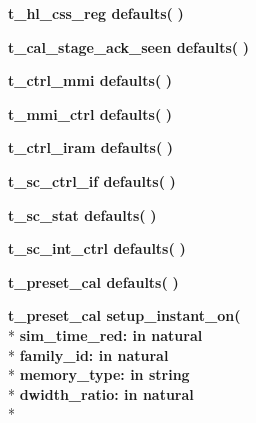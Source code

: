 \begin{DoxyCompactItemize}
\item 
{\bfseries {\bfseries {\bfseries {\bf t\+\_\+hl\+\_\+css\+\_\+reg}} \textcolor{vhdlchar}{ }}} {\bf defaults}{\bfseries  ( }{\bfseries  )} 
\item 
{\bfseries {\bfseries {\bfseries {\bf t\+\_\+cal\+\_\+stage\+\_\+ack\+\_\+seen}} \textcolor{vhdlchar}{ }}} {\bf defaults}{\bfseries  ( }{\bfseries  )} 
\item 
{\bfseries {\bfseries {\bfseries {\bf t\+\_\+ctrl\+\_\+mmi}} \textcolor{vhdlchar}{ }}} {\bf defaults}{\bfseries  ( }{\bfseries  )} 
\item 
{\bfseries {\bfseries {\bfseries {\bf t\+\_\+mmi\+\_\+ctrl}} \textcolor{vhdlchar}{ }}} {\bf defaults}{\bfseries  ( }{\bfseries  )} 
\item 
{\bfseries {\bfseries {\bfseries {\bf t\+\_\+ctrl\+\_\+iram}} \textcolor{vhdlchar}{ }}} {\bf defaults}{\bfseries  ( }{\bfseries  )} 
\item 
{\bfseries {\bfseries {\bfseries {\bf t\+\_\+sc\+\_\+ctrl\+\_\+if}} \textcolor{vhdlchar}{ }}} {\bf defaults}{\bfseries  ( }{\bfseries  )} 
\item 
{\bfseries {\bfseries {\bfseries {\bf t\+\_\+sc\+\_\+stat}} \textcolor{vhdlchar}{ }}} {\bf defaults}{\bfseries  ( }{\bfseries  )} 
\item 
{\bfseries {\bfseries {\bfseries {\bf t\+\_\+sc\+\_\+int\+\_\+ctrl}} \textcolor{vhdlchar}{ }}} {\bf defaults}{\bfseries  ( }{\bfseries  )} 
\item 
{\bfseries {\bfseries {\bfseries {\bf t\+\_\+preset\+\_\+cal}} \textcolor{vhdlchar}{ }}} {\bf defaults}{\bfseries  ( }{\bfseries  )} 
\item 
{\bfseries {\bfseries {\bfseries {\bf t\+\_\+preset\+\_\+cal}} \textcolor{vhdlchar}{ }}} {\bf setup\+\_\+instant\+\_\+on}{\bfseries  ( }\\*
{\bfseries \textcolor{vhdlchar}{sim\+\_\+time\+\_\+red\+: }\textcolor{stringliteral}{in }{\bfseries \textcolor{comment}{natural}\textcolor{vhdlchar}{ }}}\\*
{\bfseries \textcolor{vhdlchar}{family\+\_\+id\+: }\textcolor{stringliteral}{in }{\bfseries \textcolor{comment}{natural}\textcolor{vhdlchar}{ }}}\\*
{\bfseries \textcolor{vhdlchar}{memory\+\_\+type\+: }\textcolor{stringliteral}{in }{\bfseries \textcolor{comment}{string}\textcolor{vhdlchar}{ }}}\\*
{\bfseries \textcolor{vhdlchar}{dwidth\+\_\+ratio\+: }\textcolor{stringliteral}{in }{\bfseries \textcolor{comment}{natural}\textcolor{vhdlchar}{ }}}\\*

\end{DoxyCompactItemize}
